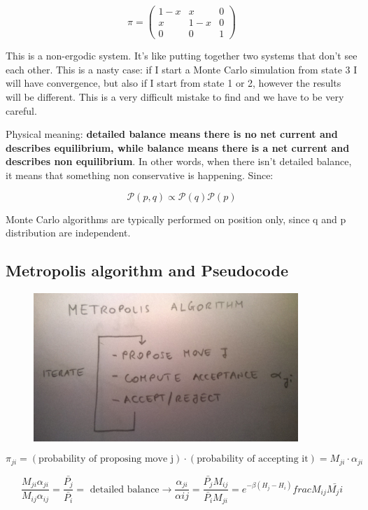 \documentclass[a4paper, italian, openany]{book}
\begin{document}
\begin{itemize}
$$\pi = \left ( \begin{array}{ccc} 1-x & x & 0 \\ x & 1-x & 0 \\ 0 & 0 & 1 \end{array} \right )$$

This is a non-ergodic system. It's like putting together two systems that don't see each other. This is a nasty case: if I start a Monte Carlo simulation from state 3 I will have convergence, but also if I start from state 1 or 2, however the results will be different. This is a very difficult mistake to find and we have to be very careful.
\end{itemize}

Physical meaning: \textbf{detailed balance means there is no net current and describes equilibrium, while balance means there is a net current and describes non equilibrium}. In other words, when there isn't detailed balance, it means that something non conservative is happening.\newline
Since:

$$\mathcal{P}(p,q) \propto \mathcal{P}(q) \mathcal{P}(p)$$

Monte Carlo algorithms are typically performed on position only, since q and p distribution are independent.

\subsection{Metropolis algorithm and Pseudocode}

\begin{figure}[H]
\centering
\includegraphics[width=100mm]{img/pic17.jpg}
\end{figure}

$$\pi_{ji} = (\mbox{probability of proposing move j})\cdot (\mbox{probability of accepting it}) = M_{ji} \cdot \alpha_{ji}$$

$$\frac{M_{ji}\alpha_{ji}}{M_{ij}\alpha_{ij}} = \frac{\bar{P_j}}{\bar{P_i}} = \mbox{ detailed balance} \rightarrow \frac{\alpha_{ji}}{\alpha{ij}} = \frac{\bar{P_j}M_{ij}}{\bar{P_i}M_{ji}} = e^{-\beta(H_j - H_i)}frac{M_{ij}}{\bar{M_ji}}$$
\end{document}

